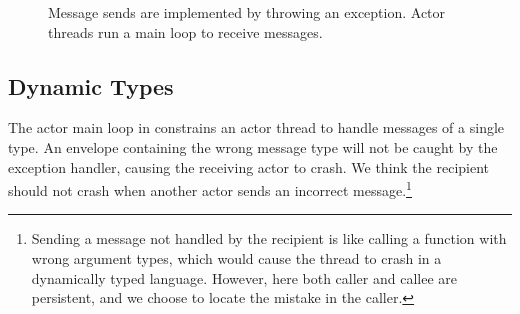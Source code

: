\documentclass[sigplan,screen]{acmart}
\newcommand{\Conid}[1]{\mathit{#1}}
\newcommand{\Varid}[1]{\mathit{#1}}
\def\resethooks{%
  \global\let\SaveRestoreHook\empty
  \global\let\ColumnHook\empty}
\newcommand{\hsindent}[1]{\quad}%
\begin{document}
\begin{figure}
\resethooks
\caption{
    Message sends are implemented by throwing an exception.
    Actor threads run a main loop to receive messages.
}
\label{fig:static-impl}
\end{figure}




\subsection{Dynamic Types}
\label{sec:dynamic-types}


The actor main loop in  constrains an actor
thread to handle messages of a single type.
%
An envelope containing the wrong message type will not be caught by the
exception handler, causing the receiving actor to crash.
%
We think the recipient should not crash when another actor sends an incorrect
message.\footnote{
    Sending a message not handled by the recipient is like calling a function
    with wrong argument types, which would cause the thread to crash in a
    dynamically typed language. However, here both caller and callee are
    persistent, and we choose to locate the mistake in the caller.
}
\end{document}
